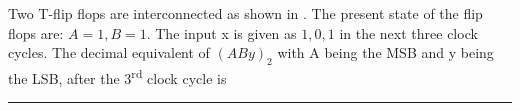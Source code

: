  Two T-flip flops are interconnected as shown in . The present state of the flip flops are: $A = 1, B = 1$. The input x is given as $1, 0, 1$ in the next three clock cycles. The decimal equivalent of $(ABy)_{2}$ with A being the MSB and y being the LSB, after the 3\textsuperscript{rd} clock cycle is \rule{12mm}{0.4pt}

		\vspace{1cm}
	\begin{figure}[ht]
		\centering
		
		\caption{}
		\label{fig:tff1}
	\end{figure}
